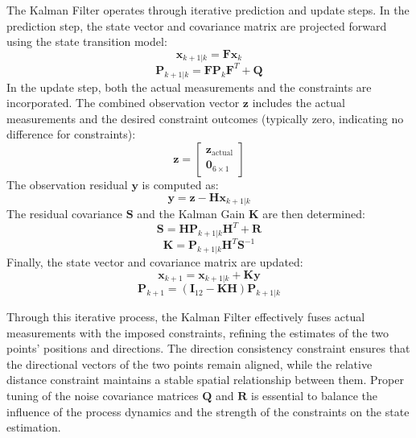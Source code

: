 The Kalman Filter operates through iterative prediction and update steps. In the prediction step, the state vector and covariance matrix are projected forward using the state transition model:
\begin{equation}
\mathbf{x}_{k+1|k} = \mathbf{F} \mathbf{x}_k
\end{equation}
\begin{equation}
\mathbf{P}_{k+1|k} = \mathbf{F} \mathbf{P}_k \mathbf{F}^T + \mathbf{Q}
\end{equation}
In the update step, both the actual measurements and the constraints are incorporated. The combined observation vector $\mathbf{z}$ includes the actual measurements and the desired constraint outcomes (typically zero, indicating no difference for constraints):
\begin{equation}
\mathbf{z} = \begin{bmatrix}
\mathbf{z}_{\text{actual}} \\
\mathbf{0}_{6 \times 1}
\end{bmatrix}
\end{equation}
The observation residual $\mathbf{y}$ is computed as:
\begin{equation}
\mathbf{y} = \mathbf{z} - \mathbf{H} \mathbf{x}_{k+1|k}
\end{equation}
The residual covariance $\mathbf{S}$ and the Kalman Gain $\mathbf{K}$ are then determined:
\begin{equation}
\mathbf{S} = \mathbf{H} \mathbf{P}_{k+1|k} \mathbf{H}^T + \mathbf{R}
\end{equation}
\begin{equation}
\mathbf{K} = \mathbf{P}_{k+1|k} \mathbf{H}^T \mathbf{S}^{-1}
\end{equation}
Finally, the state vector and covariance matrix are updated:
\begin{equation}
\mathbf{x}_{k+1} = \mathbf{x}_{k+1|k} + \mathbf{K} \mathbf{y}
\end{equation}
\begin{equation}
\mathbf{P}_{k+1} = (\mathbf{I}_{12} - \mathbf{K} \mathbf{H}) \mathbf{P}_{k+1|k}
\end{equation}

Through this iterative process, the Kalman Filter effectively fuses actual measurements with the imposed constraints, refining the estimates of the two points' positions and directions. The direction consistency constraint ensures that the directional vectors of the two points remain aligned, while the relative distance constraint maintains a stable spatial relationship between them. Proper tuning of the noise covariance matrices $\mathbf{Q}$ and $\mathbf{R}$ is essential to balance the influence of the process dynamics and the strength of the constraints on the state estimation.



